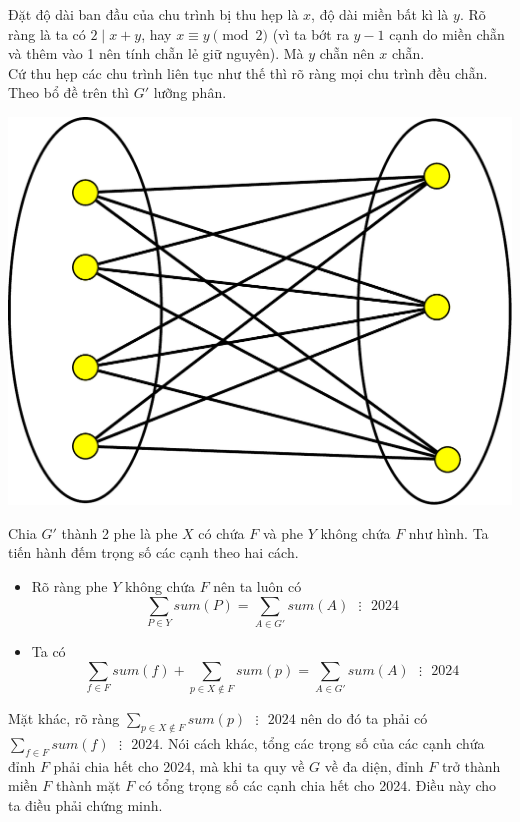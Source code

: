 \documentclass[11pt]{scrartcl}
\begin{document}
\begin{itemize}[label=, leftmargin=0em, itemsep=0.5em]
\begin{sol}
        Đặt độ dài ban đầu của chu trình bị thu hẹp là $x$, độ dài miền bất kì là $y$. Rõ ràng là ta có $2 \mid x + y$, hay $x \equiv y \pmod 2$ (vì ta bớt ra $y-1$ cạnh do miền chẵn và thêm vào 1 nên tính chẵn lẻ giữ nguyên). Mà $y$ chẵn nên $x$ chẵn. \\
        Cứ thu hẹp các chu trình liên tục như thế thì rõ ràng mọi chu trình đều chẵn. Theo bổ đề trên thì $G'$ lưỡng phân.


        \begin{center}
            \includegraphics[scale=0.25]{Image/kphec.pdf}
        \end{center}
        Chia $G'$ thành 2 phe là phe $X$ có chứa $F$ và phe $Y$ không chứa $F$ như hình. Ta tiến hành đếm trọng số các cạnh theo hai cách.
        \begin{itemize}[label=]
            \item {}   Rõ ràng phe $Y$ không chứa $F$ nên ta luôn có $$\sum_{P \in Y} sum(P) = \sum_{A \in G'}sum(A) \text{ } \vdots \text{ }2024$$
            \item {}  Ta có 
            $$\sum_{f \in F}sum(f) + \sum_{p \in X \notin F}sum(p) =  \sum_{A \in G'}sum(A) \text{ } \vdots \text{ }2024
            $$
        \end{itemize}
        Mặt khác, rõ ràng $\displaystyle  \sum_{p \in X \notin F}sum(p)\text{ } \vdots \text{ }2024$ nên do đó ta phải có $\displaystyle\sum_{f \in F}sum(f) \text{ } \vdots \text{ }2024$. Nói cách khác, tổng các trọng số của các cạnh chứa đỉnh $F$ phải chia hết cho 2024, mà khi ta quy về $G$ về đa diện, đỉnh $F$ trở thành miền $F$ thành mặt $F$ có tổng trọng số các cạnh chia hết cho 2024. Điều này cho ta điều phải chứng minh. 

\end{sol}
\end{itemize}
\end{document}
